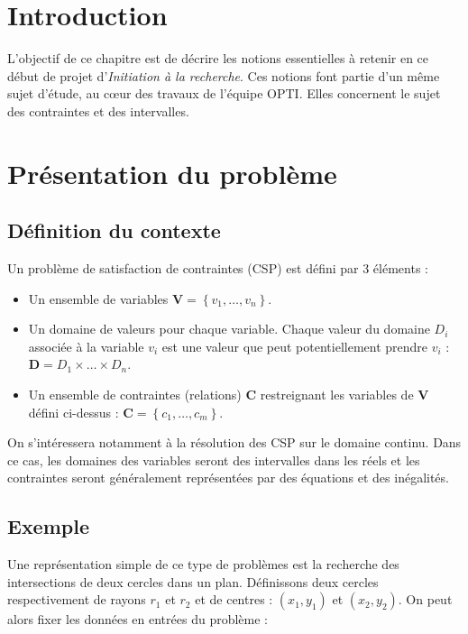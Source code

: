 \section{Introduction }
L'objectif de ce chapitre est de décrire les notions essentielles à retenir en ce début de projet d'\emph{Initiation à la recherche}. Ces notions font partie d'un même sujet d'étude, au cœur des travaux de l'équipe \textsc{OPTI}. Elles concernent le sujet des contraintes et des intervalles. %

\section{Présentation du problème}
\subsection{Définition du contexte}
Un problème de satisfaction de contraintes (\textsc{CSP}) est défini par 3 éléments : 
\begin{itemize}
\item
Un ensemble de variables $\mathbf{V} = \left\{ v_1, \dots ,v_n \right\}$.
\item
Un domaine de valeurs pour chaque variable. Chaque valeur du domaine $D_i$ associée à la variable $v_i$ est une valeur que peut potentiellement prendre $v_i$ : $\mathbf{D} = D_1 \times \dots \times D_n $.
\item
Un ensemble de contraintes (relations) $\mathbf{C}$ restreignant les variables de $\mathbf{V}$ défini ci-dessus :  $\mathbf{C} = \left\{c_1, \dots ,c_m\right\}$. 
\end{itemize}

On s'intéressera notamment à la résolution des \textsc{CSP} sur le domaine continu. Dans ce cas, les domaines des variables seront des intervalles dans les réels et les contraintes seront généralement représentées par des équations et des inégalités. 

\subsection{Exemple}

Une représentation simple de ce type de problèmes est la recherche des intersections de deux cercles dans un plan. Définissons deux cercles respectivement de rayons  $r_1$ et $r_2$ et de centres : $(x_1,y_1)$ et $(x_2,y_2)$.
On peut alors fixer les données en entrées du problème :


